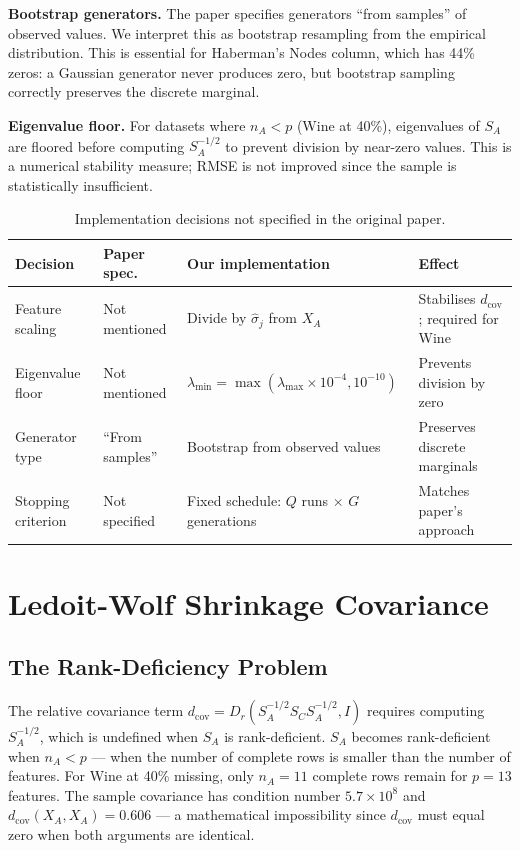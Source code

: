 \textbf{Bootstrap generators.} The paper specifies generators ``from samples'' of observed values. We interpret this as bootstrap resampling from the empirical distribution. This is essential for Haberman's Nodes column, which has 44\% zeros: a Gaussian generator never produces zero, but bootstrap sampling correctly preserves the discrete marginal.

\textbf{Eigenvalue floor.} For datasets where $n_A < p$ (Wine at 40\%), eigenvalues of $S_A$ are floored before computing $S_A^{-1/2}$ to prevent division by near-zero values. This is a numerical stability measure; RMSE is not improved since the sample is statistically insufficient.

\begin{table}[h]
\caption{Implementation decisions not specified in the original paper.}
\label{tab:decisions}
\centering
\begin{tabular}{p{2.5cm}p{2.8cm}p{5.8cm}p{2.2cm}}
\toprule
\textbf{Decision} & \textbf{Paper spec.} & \textbf{Our implementation} & \textbf{Effect} \\
\midrule
Feature scaling       & Not mentioned  & Divide by $\hat{\sigma}_j$ from $X_A$ & Stabilises $d_{\text{cov}}$; required for Wine \\
Eigenvalue floor      & Not mentioned  & $\lambda_{\min} = \max(\lambda_{\max} \times 10^{-4}, 10^{-10})$ & Prevents division by zero \\
Generator type        & ``From samples'' & Bootstrap from observed values & Preserves discrete marginals \\
Stopping criterion    & Not specified  & Fixed schedule: $Q$ runs $\times$ $G$ generations & Matches paper's approach \\
\bottomrule
\end{tabular}
\end{table}

\section{Ledoit-Wolf Shrinkage Covariance}
\label{sec:lw}

\subsection{The Rank-Deficiency Problem}

The relative covariance term $d_{\text{cov}} = D_r(S_A^{-1/2} S_C S_A^{-1/2}, I)$ requires computing $S_A^{-1/2}$, which is undefined when $S_A$ is rank-deficient. $S_A$ becomes rank-deficient when $n_A < p$ --- when the number of complete rows is smaller than the number of features. For Wine at 40\% missing, only $n_A = 11$ complete rows remain for $p = 13$ features. The sample covariance has condition number $5.7 \times 10^8$ and $d_{\text{cov}}(X_A, X_A) = 0.606$ --- a mathematical impossibility since $d_{\text{cov}}$ must equal zero when both arguments are identical.

